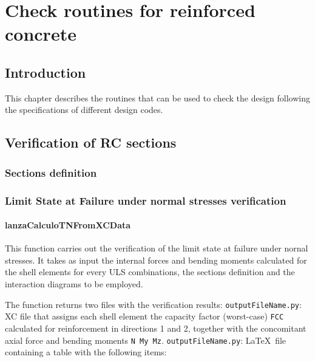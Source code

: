 \chapter{Check routines for reinforced concrete}
\section{Introduction}
This chapter describes the routines that can be used to check the design following the specifications of different design codes.

\section{Verification of RC sections}

\subsection{Sections definition}



\subsection{Limit State at Failure under normal stresses verification}

\subsubsection{lanzaCalculoTNFromXCData}
This function carries out the verification of the limit state at failure under nornal stresses. It takes as input the internal forces and bending moments calculated for the shell elements for every ULS combinations, the sections definition and the interaction diagrams to be employed.

The function returns two files with the verification results:
{\tt outputFileName.py}: XC file that assigns each shell element the capacity factor (worst-case) {\tt FCC} calculated for reinforcement in directions 1 and 2, together with the concomitant axial force and bending moments {\tt N My Mz}.
{\tt outputFileName.py}: \LaTeX\  file containing a table with the following items:

